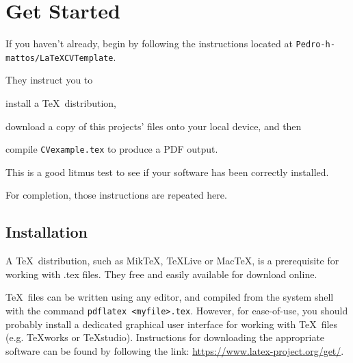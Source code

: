 \section{Get Started}
%
%


If you haven't already, begin by following the instructions located at \lstinline|Pedro-h-mattos/LaTeXCVTemplate|. \par

They instruct you to
\begin{enumerate*}[label=(\roman*)]
  \item install a \TeX~distribution, 
  \item download a copy of this projects' files onto your local device, and then 
  \item compile \lstinline|CVexample.tex| to produce a PDF output.
\end{enumerate*}
This is a good litmus test to see if your software has been correctly installed. \par

For completion, those instructions are repeated here. \par

\subsection{Installation}
A \TeX~distribution, such as MikTeX, TeXLive or MacTeX, is a prerequisite for working with .tex files. They free and easily available for download online. \par

\TeX~files can be written using any editor, and compiled from the system shell with the command \lstinline|pdflatex <myfile>.tex|. However, for ease-of-use, you should probably install a dedicated graphical user interface for working with \TeX~files (e.g. TeXworks or TeXstudio). Instructions for downloading the appropriate software can be found by following the link: \url{https://www.latex-project.org/get/}. \par

